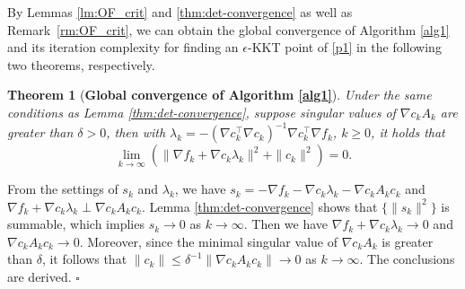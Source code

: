\documentclass[11pt]{article}
\newtheorem{theorem}{Theorem}
\newenvironment{proof}{{\noindent\it Proof.}\quad}{\hfill $\square$\par}
\begin{document}
By Lemmas \ref{lm:OF_crit} and \ref{thm:det-convergence} %
as well as Remark~\ref{rm:OF_crit}, we can  obtain the global convergence of Algorithm \ref{alg1} and its iteration complexity for finding an $\epsilon$-KKT point of \eqref{p1} in the following two theorems, respectively.
\begin{theorem}[{\bf Global convergence of Algorithm \ref{alg1}}]\label{cor:det-convergence}
    Under the same conditions as Lemma \ref{thm:det-convergence}, suppose  singular values of \(\nabla c_k A_k\) are greater than \(\delta > 0\), then with \(\lambda_k = - (\nabla c_k^{\top} \nabla c_k)^{-1} \nabla c_k^{\top} \nabla f_k\), \(k \ge 0\), it holds that
    \begin{equation*}
    \lim_{k \to \infty} \left(\|\nabla f_k + \nabla c_k \lambda_k\|^2 + \|c_k\|^2 \right) = 0.
    \end{equation*}
\end{theorem}
\begin{proof}
    From the settings of \(s_k\) and \(\lambda_k\), we have \(s_k = - \nabla f_k - \nabla c_k \lambda_k - \nabla c_k A_k c_k\) and \(\nabla f_k + \nabla c_k \lambda_k \perp \nabla c_k A_k c_k\). Lemma  \ref{thm:det-convergence} shows that \(\{\|s_k\|^2\}\) is summable, which implies \(s_k \to 0\) as $k\to\infty$. Then we have \(\nabla f_k + \nabla c_k \lambda_k \to 0\) and \(\nabla c_k A_k c_k \to 0\). Moreover, since the minimal singular value of \(\nabla c_k A_k\) is greater than \(\delta \), it follows that \(\|c_k\| \leq \delta^{-1} \|\nabla c_k A_k c_k\| \to 0\) as $k\to \infty$. The conclusions are derived.
\end{proof}



\end{document}
